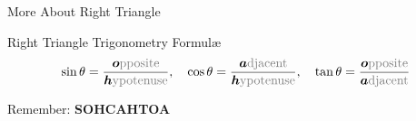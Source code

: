 \documentclass[9pt, xcolor={svgnames, x11names},professionalfonts]{beamer}
\begin{document}

\begin{frame}{More About Right Triangle}
	

	\begin{statsbox}[top=0mm]{Right Triangle Trigonometry Formul\ae}
		\centering
		$$		
		\sin\theta = \frac{{\bm o}\text{\textcolor{gray}{pposite}}}{{\bm h}\text{\textcolor{gray}{ypotenuse}}}, \quad
		\cos\theta = \frac{{\bm a}\text{\textcolor{gray}{djacent}}}{{\bm h}\text{\textcolor{gray}{ypotenuse}}},
		\quad
		\tan\theta = \frac{{\bm o}\text{\textcolor{gray}{pposite}}}{{\bm a}\text{\textcolor{gray}{djacent}}}
		$$
  \end{statsbox}
	\centering
	Remember: {\bfseries SOHCAHTOA}

	

\end{frame}
\end{document}

